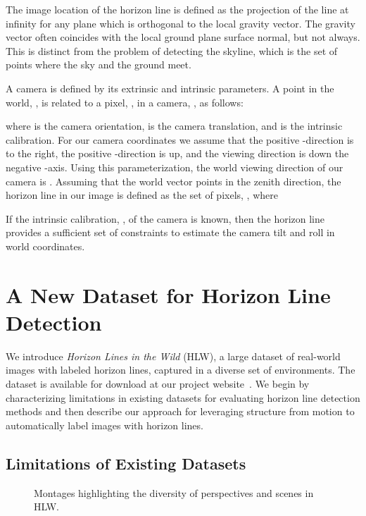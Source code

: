 \documentclass{bmvc2k}
\begin{document}
The image location of the horizon line is defined as the projection of
the line at infinity for any plane which is orthogonal to the local
gravity vector. The gravity vector often coincides with the local
ground plane surface normal, but not always.  This is distinct from
the problem of detecting the skyline, which is the set of points
where the sky and the ground meet. 
    
A camera is defined by its extrinsic and intrinsic parameters.  A
point in the world, , is related to a pixel, , in
a camera, , as follows: 

where  is the camera orientation,  is the camera
translation, and  is the intrinsic calibration.  For our camera
coordinates we assume that the positive -direction is to the right,
the positive -direction is up, and the viewing direction is down
the negative -axis. Using this parameterization, the world viewing
direction of our camera is .
Assuming that the world vector  points in the
zenith direction, the horizon line in our image is defined as the set
of pixels, , where 

If the intrinsic calibration, , of the camera is known, then the
horizon line provides a sufficient set of constraints to estimate the
camera tilt and roll in world coordinates.


\section{A New Dataset for Horizon Line Detection}

We introduce {\em Horizon Lines in the Wild} (HLW), a large dataset of
real-world images with labeled horizon lines, captured in a diverse
set of environments. 
The dataset is available for download at
our project website~\cite{hlwsite}.
We begin by characterizing limitations in existing
datasets for evaluating horizon line detection methods and then
describe our approach for leveraging structure from motion to
automatically label images with horizon lines.

\subsection{Limitations of Existing Datasets}

\begin{figure}

  \centering
 

  \caption{Montages highlighting the diversity of perspectives and scenes in HLW.} 

  \label{fig:dataset}

\end{figure}
\end{document}
